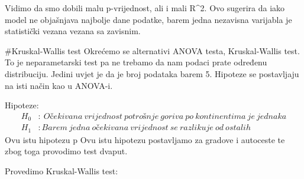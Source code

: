 \documentclass[
]{article}
\newenvironment{Shaded}{\begin{snugshade}}{\end{snugshade}}
\newcommand{\AttributeTok}[1]{\textcolor[rgb]{0.13,0.29,0.53}{#1}}
\newcommand{\FloatTok}[1]{\textcolor[rgb]{0.00,0.00,0.81}{#1}}
\newcommand{\FunctionTok}[1]{\textcolor[rgb]{0.13,0.29,0.53}{\textbf{#1}}}
\newcommand{\NormalTok}[1]{#1}
\newcommand{\OtherTok}[1]{\textcolor[rgb]{0.56,0.35,0.01}{#1}}
\newcommand{\SpecialCharTok}[1]{\textcolor[rgb]{0.81,0.36,0.00}{\textbf{#1}}}
\newcommand{\StringTok}[1]{\textcolor[rgb]{0.31,0.60,0.02}{#1}}
\begin{document}
Vidimo da smo dobili malu p-vrijednost, ali i mali R\^{}2. Ovo sugerira
da iako model ne objašnjava najbolje dane podatke, barem jedna nezavisna
varijabla je statistički vezana vezana sa zavisnim.

\#Kruskal-Wallis test Okrećemo se alternativi ANOVA testa,
Kruskal-Wallis test. To je neparametarski test pa ne trebamo da nam
podaci prate određenu distribuciju. Jedini uvjet je da je broj podataka
barem 5. Hipoteze se postavljaju na isti način kao u ANOVA-i.

Hipoteze: \[\begin{aligned}
H_0 &:\ Očekivana\ vrijednost\ potrošnje\ goriva\ po\ kontinentima\ je\ jednaka\\
H_1 &: Barem\ jedna\ očekivana\ vrijednost\ se\ razlikuje\ od\ ostalih
\end{aligned}\] Ovu istu hipotezu p Ovu istu hipotezu postavljamo za
gradove i autoceste te zbog toga provodimo test dvaput.

Provedimo Kruskal-Wallis test:

\begin{Shaded}
\end{Shaded}
\end{document}
